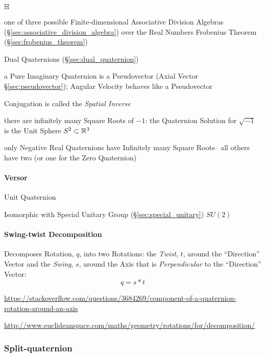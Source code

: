 $\mathbb{H}$

one of three possible Finite-dimensional Associative Division Algebras
(\S\ref{sec:associative_division_algebra}) over the Real Numbers \fist
Frobenius Theorem (\S\ref{sec:frobenius_theorem})

\fist Dual Quaternions (\S\ref{sec:dual_quaternion})

a Pure Imaginary Quaternion is a Pseudovector (Axial Vector
\S\ref{sec:pseudovector}); Angular Velocity behaves like a Pseudovector

Conjugation is called the \emph{Spatial Inverse}

there are infinitely many Square Roots of $-1$: the Quaternion Solution for
$\sqrt{-1}$ is the Unit Sphere $S^2 \subset \mathbb{R}^3$

only Negative Real Quaternions have Infinitely many Square Roots-- all others
have two (or one for the Zero Quaternion)



\paragraph{Versor}\label{sec:versor}

Unit Quaternion

Isomorphic with Special Unitary Group (\S\ref{sec:special_unitary}) $SU(2)$



\paragraph{Swing-twist Decomposition}\label{sec:swing_twist}

Decomposes Rotation, $q$, into two Rotations: the \emph{Twist}, $t$, around the
``Direction'' Vector and the \emph{Swing}, $s$, around the Axis that is
\emph{Perpendicular} to the ``Direction'' Vector:
\[
  q = s * t
\]

\url{https://stackoverflow.com/questions/3684269/component-of-a-quaternion-rotation-around-an-axis}

\url{http://www.euclideanspace.com/maths/geometry/rotations/for/decomposition/}



\subsubsection{Split-quaternion}\label{sec:split_quaternion}



